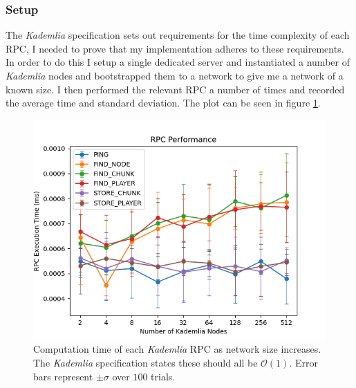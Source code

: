\documentclass[12pt,notitlepage,a4paper]{report}
\newcommand{\kademlia}{\emph{Kademlia}}
\begin{document}
	\subsubsection{Setup}
	The \kademlia{} specification sets out requirements for the time complexity of each RPC, I needed to prove that my implementation adheres to these requirements. In order to do this I setup a single dedicated server and instantiated a number of \kademlia{} nodes and bootstrapped them to a network to give me a network of a known size. I then performed the relevant RPC a number of times and recorded the average time and standard deviation. The plot can be seen in figure \ref{fig:kadperforma}.
	\begin{figure}
		\includegraphics[width=\textwidth]{rpcperformance.png}
		\caption[RPC Performance]{Computation time of each \kademlia{} RPC as network size increases. The \kademlia{} specification states these should all be $\mathcal{O}(1)$. Error bars represent $\pm\sigma$ over $100$ trials.}
		\label{fig:kadperforma}
	\end{figure}
\end{document}
